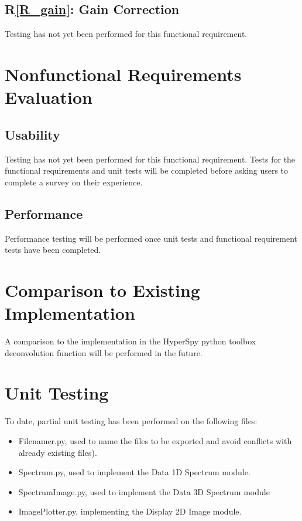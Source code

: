 \documentclass[12pt, titlepage]{article}
\newcommand{\rref}[1]{R\ref{#1}}
\begin{document}
\subsection{\rref{R_gain}: Gain Correction}
Testing has not yet been performed for this functional requirement.

\section{Nonfunctional Requirements Evaluation}

\subsection{Usability}
Testing has not yet been performed for this functional requirement. Tests for
the functional requirements and unit tests will be completed before asking users
to complete a survey on their experience.

\subsection{Performance}
Performance testing will be performed once unit tests and functional requirement
tests have been completed.

\section{Comparison to Existing Implementation}	
A comparison to the implementation in the HyperSpy python toolbox deconvolution
function will be performed in the future.

\section{Unit Testing}
\label{sec:UnitTest}
To date, partial unit testing has been performed on the following files:
\begin{itemize}
    \item Filenamer.py, used to name the files to be exported and avoid
    conflicts with already existing files).
    \item Spectrum.py, used to implement the Data 1D Spectrum module.
    \item SpectrumImage.py, used to implement the Data 3D Spectrum module
    \item ImagePlotter.py, implementing the Display 2D Image module.
\end{itemize}
\end{document}
